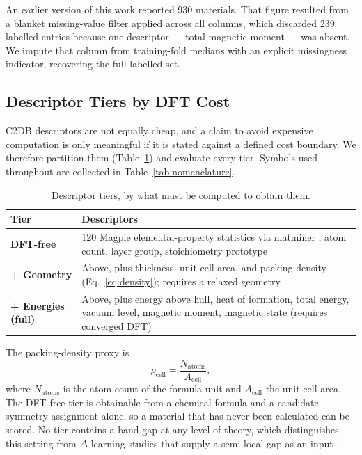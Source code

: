 \documentclass{ieeeaccess}
\begin{document}
An earlier version of this work reported 930 materials. That figure resulted from a blanket missing-value filter applied across all columns, which discarded 239 labelled entries because one descriptor --- total magnetic moment --- was absent. We impute that column from training-fold medians with an explicit missingness indicator, recovering the full labelled set.

\subsection{Descriptor Tiers by DFT Cost}
\label{sec:tiers}
C2DB descriptors are not equally cheap, and a claim to avoid expensive computation is only meaningful if it is stated against a defined cost boundary. We therefore partition them (Table~\ref{tab:tiers}) and evaluate every tier. Symbols used throughout are collected in Table~\ref{tab:nomenclature}.

\begin{table}[!t]
\caption{Descriptor tiers, by what must be computed to obtain them.\label{tab:tiers}}
\centering
\begin{tabular}{p{}p{}}
\toprule
Tier & Descriptors \\
\midrule
\textbf{DFT-free} & 120 Magpie elemental-property statistics \cite{ward2016general} via matminer \cite{ward2018matminer}, atom count, layer group, stoichiometry prototype \\
\addlinespace
\textbf{+ Geometry} & Above, plus thickness, unit-cell area, and packing density (Eq.~\eqref{eq:density}); requires a relaxed geometry \\
\addlinespace
\textbf{+ Energies (full)} & Above, plus energy above hull, heat of formation, total energy, vacuum level, magnetic moment, magnetic state (requires converged DFT) \\
\bottomrule
\end{tabular}
\end{table}

The packing-density proxy is
\begin{equation}
\rho_{\mathrm{cell}} = \frac{N_{\mathrm{atoms}}}{A_{\mathrm{cell}}},
\label{eq:density}
\end{equation}
where $N_{\mathrm{atoms}}$ is the atom count of the formula unit and $A_{\mathrm{cell}}$ the unit-cell area. The DFT-free tier is obtainable from a chemical formula and a candidate symmetry assignment alone, so a material that has never been calculated can be scored. No tier contains a band gap at any level of theory, which distinguishes this setting from $\Delta$-learning studies that supply a semi-local gap as an input \cite{zhang2021bandgap}.
\end{document}

